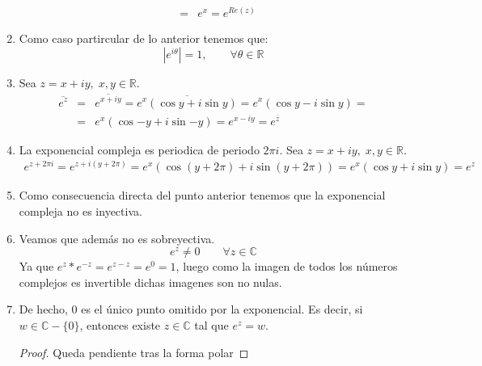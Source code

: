 \begin{enumerate}
\begin{eqnarray*}
            & = & e^x = e^{Re(z)}
    \end{eqnarray*} 
  \item Como caso partircular de lo anterior tenemos que:
    \[ |e^{i\theta} | = 1, \qquad \forall \theta \in \mathbb{R} \]
  \item Sea \(z=x+iy, \; x,y\in \mathbb{R}\).
    \begin{eqnarray*}
      \overline{e^z} & = & \overline{e^{x+iy}} = \overline{e^x(\cos{y}+i\sin{y})} = e^x(\cos{y}-i\sin{y}) = \\
                     & = & e^x(\cos{-y}+i\sin{-y}) = e^{x-iy} = e^{\overline{z}}
    \end{eqnarray*}
  \item La exponencial compleja es periodica de periodo \(2 \pi i \). Sea \(z=x+iy, \; x,y\in \mathbb{R}\).
    \begin{eqnarray*}
      e^{z+2\pi i} = e^{z+i(y+2\pi)} = e^x(\cos(y+2\pi)+i\sin(y+2\pi)) = e^x(\cos{y}+i\sin{y}) = e^z
    \end{eqnarray*}
  \item Como consecuencia directa del punto anterior tenemos que la exponencial compleja no es inyectiva.
  \item Veamos que además no es sobreyectiva.
    \[e^z \neq 0 \qquad \forall z \in \mathbb{C}\]
    Ya que \(e^z*e^{-z} = e^{z-z} = e^0 = 1\), luego como la imagen de todos los números complejos es invertible dichas imagenes son no nulas.
  \item De hecho, 0 es el único punto omitido por la exponencial. Es decir, si \(w\in \mathbb{C}-\{0\}\), entonces existe \(z\in \mathbb{C}\) tal que \(e^z=w\).
    \begin{proof}
      Queda pendiente tras la forma polar %
    \end{proof}

\end{enumerate}

